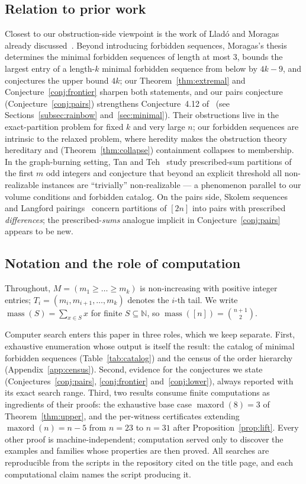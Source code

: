 \documentclass[11pt]{article}
\theoremstyle{definition}
\theoremstyle{remark}
\newcommand{\mass}{\operatorname{mass}}
\newcommand{\maxord}{\operatorname{maxord}}
\newcommand{\N}{\mathbb{N}}
\newcommand{\intv}[1]{[#1]}
\begin{document}
\subsection{Relation to prior work}

Closest to our obstruction-side viewpoint is the work of Lladó and Moragas
already discussed~\cite{LladoMoragas09,Moragas10,LladoMoragas12}. Beyond
introducing forbidden sequences, Moragas's thesis~\cite[\S4.2.1]{Moragas10}
determines the minimal forbidden sequences of length at most $3$, bounds the
largest entry of a length-$k$ minimal forbidden sequence from below by $4k-9$,
and conjectures the upper bound $4k$; our Theorem~\ref{thm:extremal} and
Conjecture~\ref{conj:frontier} sharpen both statements, and our pairs conjecture
(Conjecture~\ref{conj:pairs}) strengthens Conjecture~4.12 of~\cite{Moragas10}
(see Sections~\ref{subsec:rainbow} and~\ref{sec:minimal}).
Their obstructions live in the exact-partition problem for fixed $k$ and very large
$n$; our forbidden sequences are intrinsic to the relaxed problem, where heredity
makes the obstruction theory hereditary and (Theorem~\ref{thm:collapse}) containment
collapses to membership. In the graph-burning setting, Tan and Teh~\cite{TanTeh24}
study prescribed-sum partitions of the first $m$ odd integers and conjecture that
beyond an explicit threshold all non-realizable instances are ``trivially''
non-realizable --- a phenomenon parallel to our volume conditions and forbidden
catalog. On the pairs side, Skolem sequences~\cite{Skolem57} and Langford
pairings~\cite{Langford58,Davies59} concern partitions of $\intv{2n}$ into pairs
with prescribed \emph{differences}; the prescribed-\emph{sums} analogue implicit in
Conjecture~\ref{conj:pairs} appears to be new.

\subsection{Notation and the role of computation}

Throughout, $M=(m_1\ge\dots\ge m_k)$ is non-increasing with positive integer entries;
$T_i=(m_i,m_{i+1},\dots,m_k)$ denotes the $i$-th tail. We write
$\mass(S)=\sum_{x\in S}x$ for finite $S\subseteq\N$, so
$\mass(\intv{n})=\binom{n+1}{2}$.

Computer search enters this paper in three roles, which we keep separate.
First, exhaustive enumeration whose output is itself the result: the catalog of
minimal forbidden sequences (Table~\ref{tab:catalog}) and the census of the
order hierarchy (Appendix~\ref{app:census}). Second, evidence for the
conjectures we state (Conjectures~\ref{conj:pairs}, \ref{conj:frontier}
and~\ref{conj:lower}), always reported with its exact search range. Third, two
results consume finite computations as ingredients of their proofs: the
exhaustive base case $\maxord(8)=3$ of Theorem~\ref{thm:upper}, and the
per-witness certificates extending $\maxord(n)=n-5$ from $n=23$ to $n=31$
after Proposition~\ref{prop:lift}. Every other proof is machine-independent;
computation served only to discover the examples and families whose properties
are then proved. All searches are reproducible from the scripts in the
repository cited on the title page, and each computational claim names the
script producing it.
\end{document}
